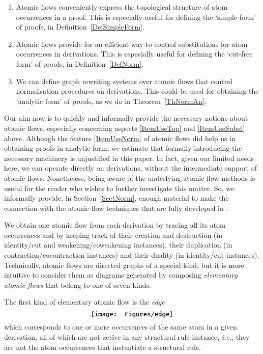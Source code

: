 \begin{enumerate}
\item\label{item:UseTop} Atomic flows conveniently express the topological structure of atom occurrences in a proof. This is especially useful for defining the `simple form' of proofs, in Definition~\ref{DefSimpleForm}.
\item\label{item:UseSubst} Atomic flows provide for an efficient way to control substitutions for atom occurrences in derivations. This is especially useful for defining the `cut-free form' of proofs, in Definition~\ref{DefNorm}.
\item\label{item:UseNorm} We can define graph rewriting systems over atomic flows that control normalisation procedures on derivations. This could be used for obtaining the `analytic form' of proofs, as we do in Theorem~\ref{ThNormAn}. 
\end{enumerate}
Our aim now is to quickly and informally provide the necessary notions about atomic flows, especially concerning aspects \eqref{ItemUseTop} and \eqref{ItemUseSubst} above. Although the feature \eqref{ItemUseNorm} of atomic flows did help us in obtaining proofs in analytic form, we estimate that formally introducing the necessary machinery is unjustified in this paper. In fact, given our limited needs here, we can operate directly on derivations, without the intermediate support of atomic flows. Nonetheless, being aware of the underlying atomic-flow methods is useful for the reader who wishes to further investigate this matter. So, we informally provide, in Section~\ref{SectNorm}, enough material to make the connection with the atomic-flow techniques that are fully developed in \cite{GuglGund:07:Normalis:lr}.

We obtain one atomic flow from each derivation by tracing all its atom occurrences and by keeping track of their creation and destruction (in identity/cut and weak\-en\-ing/co\-weak\-en\-ing instances), their duplication (in contraction/cocontraction instances) and their duality (in identity/cut instances). Technically, atomic flows are directed graphs of a special kind, but it is more intuitive to consider them as diagrams generated by composing \emph{elementary atomic flows} that belong to one of seven kinds.

The first kind of elementary atomic flow is the \emph{edge}
\[
\vcenter{\hbox{\texttt{[image: Figures/edge]}}}
\]
which corresponds to one or more occurrences of the same atom in a given derivation, all of which are not active in any structural rule instance, \emph{i.e.}, they are not the atom occurrences that instantiate a structural rule.

